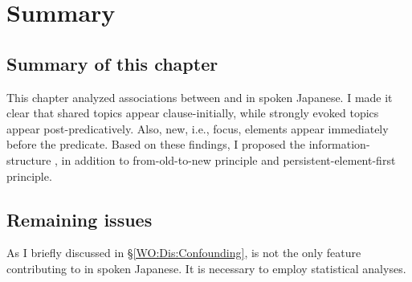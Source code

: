 






\section{Summary}

\subsection{Summary of this chapter}

This chapter analyzed associations between  and  in spoken Japanese.
I made it clear that
shared topics appear clause-initially,
while strongly evoked topics appear post-predicatively.
Also, new, i.e., focus, elements appear immediately before the predicate.
Based on these findings,
I proposed the information-structure ,
in addition to from-old-to-new principle and persistent-element-first principle.


\subsection{Remaining issues}

As I briefly discussed in \S \ref{WO:Dis:Confounding},
 is not the only feature contributing to  in spoken Japanese.
It is necessary to employ statistical analyses.











